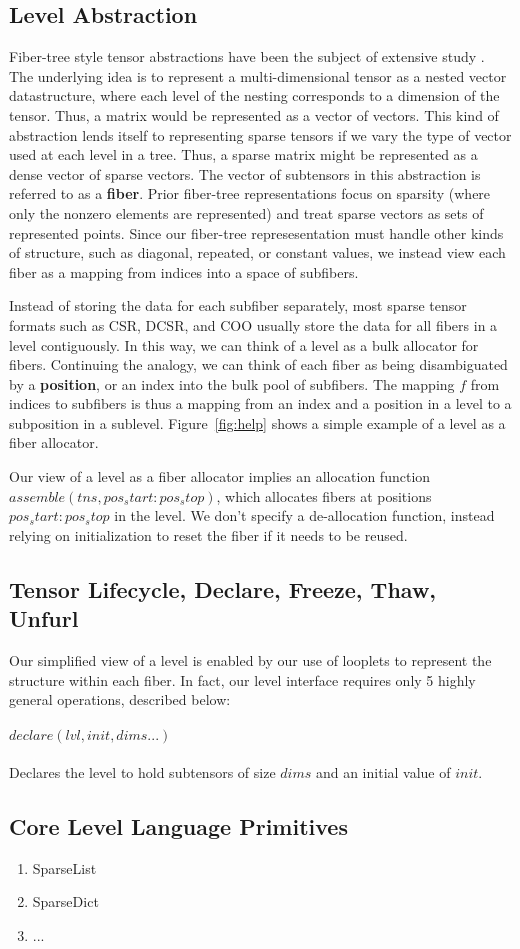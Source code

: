 \subsection{Level Abstraction}
Fiber-tree style tensor abstractions have been the subject of extensive study
\cite{sze2017efficient, chou2022compilation, chou2018format}.  The underlying
idea is to represent a multi-dimensional tensor as a nested vector
datastructure, where each level of the nesting corresponds to a dimension of the
tensor. Thus, a matrix would be represented as a vector of vectors. This kind of
abstraction lends itself to representing sparse tensors if we vary the type of
vector used at each level in a tree. Thus, a sparse matrix might be represented
as a dense vector of sparse vectors. The vector of subtensors in this
abstraction is referred to as a \textbf{fiber}. Prior fiber-tree representations
focus on sparsity (where only the nonzero elements are represented) and treat
sparse vectors as sets of represented points. Since our fiber-tree
represesentation must handle other kinds of structure, such as diagonal,
repeated, or constant values, we instead view each fiber as a mapping from
indices into a space of subfibers.

Instead of storing the data for each subfiber separately, most sparse tensor
formats such as CSR, DCSR, and COO usually store the data for all fibers in a
level contiguously. In this way, we can think of a level as a bulk allocator for
fibers. Continuing the analogy, we can think of each fiber as being
disambiguated by a \textbf{position}, or an index into the bulk pool of
subfibers. The mapping $f$ from indices to subfibers is thus a mapping from an
index and a position in a level to a subposition in a sublevel.
Figure~\ref{fig:help} shows a simple example of a level as a fiber allocator.

Our view of a level as a fiber allocator implies an allocation function
$assemble(tns, pos_start:pos_stop)$, which allocates fibers at positions
$pos_start:pos_stop$ in the level. We don't specify a de-allocation function,
instead relying on initialization to reset the fiber if it needs to be reused.

\subsection{Tensor Lifecycle, Declare, Freeze, Thaw, Unfurl}

Our simplified view of a level is enabled by our use of looplets to represent
the structure within each fiber. In fact, our level interface requires only
5 highly general operations, described below:

\paragraph{$declare(lvl, init, dims...)$} Declares the level to hold subtensors of size $dims$ and an initial value of $init$. 

\subsection{Core Level Language Primitives}
\begin{enumerate}
\item SparseList
\item SparseDict
\item ...
\end{enumerate}


